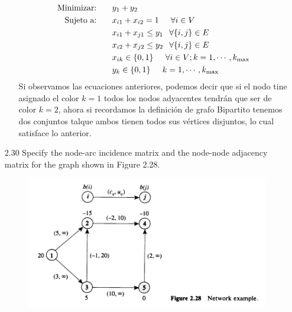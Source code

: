 \documentclass{report}
\begin{document}
\begin{enumerate}[2.1]
\begin{enumerate}[(a)]
        \begin{align*}
             \text{Minimizar: } \hspace{0.2 in} & y_1+y_2 \\
             \text{Sujeto a: } \hspace{0.2 in}  &  x_{i1} + x_{i2} = 1 \hspace{0.2 in}  \forall i \in V \\
             & x_{i1} + x_{j1} \leq y_1 \hspace{0.1 in} \forall \{i,j\} \in E\\
             & x_{i2} + x_{j2} \leq y_2 \hspace{0.1 in} \forall \{i,j\} \in E\\
             & x_{ik} \in \{0,1\} \hspace{0.2 in} \forall i \in V;k=1, \cdots, k_{\text{max}} \\
             & y_{k} \in \{0,1\} \hspace{0.2 in } k=1, \cdots, k_{\text{max}}
        \end{align*}
        Si observamos las ecuaciones anteriores, podemos decir que si el nodo tine asignado el color $k=1$ todos los nodos adyacentes tendrán que ser de color $k= 2$, ahora si recordamos la definición de grafo Bipartito tenemos dos conjuntos talque ambos tienen todos sus vértices disjuntos, lo cual satisface lo anterior.
    \end{enumerate} \newpage
    \item[2.30] Specify the node-arc incidence matrix and the node-node adjacency matrix for
    the graph shown in Figure 2.28.
    \begin{figure}[ht]
        \centering
        \includegraphics[scale = 0.3]{2.30.png}
    \end{figure}
    \begin{table}[ht]

\end{table}
\end{enumerate}
\end{document}
